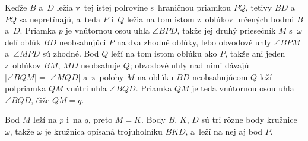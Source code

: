 {    Keďže $B$ a~$D$ ležia v~tej istej polrovine s~hraničnou priamkou $PQ$, tetivy $BD$ a~$PQ$ sa nepretínajú, a~teda $P$ i~$Q$ ležia na tom istom z~oblúkov určených bodmi $B$ a~$D$. Priamka $p$ je vnútornou osou uhla $\angle BPD$, takže jej druhý priesečník $M$ s~$\omega$ delí oblúk $BD$ neobsahujúci $P$ na dva zhodné oblúky, lebo obvodové uhly $\angle BPM$ a~$\angle MPD$ sú zhodné. Bod $Q$ leží na tom istom oblúku ako $P$, takže ani jeden z~oblúkov $BM$, $MD$ neobsahuje $Q$; obvodové uhly nad nimi dávajú $|\angle BQM| = |\angle MQD|$ a~z~polohy $M$ na oblúku $BD$ neobsahujúcom $Q$ leží polpriamka $QM$ vnútri uhla $\angle BQD$. Priamka $QM$ je teda vnútornou osou uhla $\angle BQD$, čiže $QM = q$.

    Bod $M$ leží na $p$ i~na $q$, preto $M = K$. Body $B$, $K$, $D$ sú tri rôzne body kružnice $\omega$, takže $\omega$ je kružnica opísaná trojuholníku $BKD$, a~leží na nej aj bod $P$.
}

